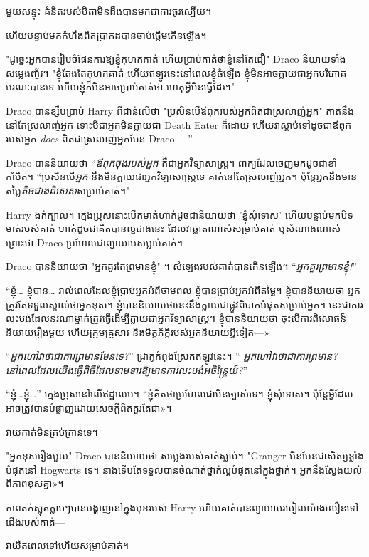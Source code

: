 {{{{{{មួយសន្ទុះ គំនិតរបស់បិតាមិនដឹងបានមកជាការធូរស្បើយ។

ហើយបន្ទាប់មកកំហឹងពិតប្រាកដបានចាប់ផ្តើមកើនឡើង។

"ដូច្នេះអ្នកបានរៀបចំផែនការឱ្យខ្ញុំកុហកគាត់ ហើយប្រាប់គាត់ថាខ្ញុំនៅតែជឿ" Draco និយាយទាំងសម្លេងញ័រ។ "ខ្ញុំតែងតែកុហកគាត់ ហើយឥឡូវនេះនៅពេលខ្ញុំធំឡើង ខ្ញុំមិនអាចក្លាយជាអ្នកបរិភោគមរណៈបានទេ ហើយខ្ញុំក៏មិនអាចប្រាប់គាត់ថា ហេតុអ្វីមិនធ្វើដែរ។"

Draco បានខ្សឹបប្រាប់ Harry ពីជាន់លើថា "ប្រសិនបើឪពុករបស់អ្នកពិតជាស្រលាញ់អ្នក" គាត់នឹងនៅតែស្រលាញ់អ្នក ទោះបីជាអ្នកមិនក្លាយជា Death Eater ក៏ដោយ ហើយវាស្តាប់ទៅដូចជាឪពុករបស់អ្នក \emph{does} ពិតជាស្រលាញ់អ្នកមែន Draco —”

Draco បាននិយាយថា “\emph{ឪពុកចុងរបស់អ្នក} គឺជាអ្នកវិទ្យាសាស្ត្រ។ ពាក្យដែលចេញមកដូចជាខាំកាំបិត។ “ប្រសិនបើ\emph{អ្នក} នឹងមិនក្លាយជាអ្នកវិទ្យាសាស្ត្រទេ គាត់នៅតែស្រលាញ់អ្នក។ ប៉ុន្តែអ្នកនឹងមានតម្លៃ\emph{តិចជាងពិសេស}សម្រាប់គាត់។"

Harry ងក់ក្បាល។ ក្មេងប្រុសនោះបើកមាត់ហាក់ដូចជានិយាយថា 'ខ្ញុំសុំទោស' ហើយបន្ទាប់មកបិទមាត់របស់គាត់ ហាក់ដូចជាគិតបានល្អជាងនេះ ដែលវាឆ្លាតណាស់សម្រាប់គាត់ ឬសំណាងណាស់ ព្រោះថា Draco ប្រហែលជាព្យាយាមសម្លាប់គាត់។

Draco បាននិយាយថា "អ្នកគួរតែព្រមានខ្ញុំ" ។ សំឡេងរបស់គាត់បានកើនឡើង។ “\emph{អ្នកគួរព្រមានខ្ញុំ!}”

“ខ្ញុំ… ខ្ញុំបាន… រាល់ពេលដែលខ្ញុំប្រាប់អ្នកអំពីថាមពល ខ្ញុំបានប្រាប់អ្នកអំពីតម្លៃ។ ខ្ញុំបាននិយាយថា អ្នកត្រូវតែទទួលស្គាល់ថាអ្នកខុស។ ខ្ញុំបាននិយាយថានេះនឹងក្លាយជាផ្លូវពិបាកបំផុតសម្រាប់អ្នក។ នេះ​ជា​ការ​លះបង់​ដែល​នរណា​ម្នាក់​ត្រូវ​ធ្វើ​ដើម្បី​ក្លាយ​ជា​អ្នក​វិទ្យាសាស្ត្រ។ ខ្ញុំ​បាន​និយាយ​ថា ចុះ​បើ​ការ​ពិសោធន៍​និយាយ​រឿង​មួយ ហើយ​ក្រុម​គ្រួសារ និង​មិត្តភ័ក្តិ​របស់​អ្នក​និយាយ​អ្វី​ទៀត—»

“\emph{អ្នកហៅវាថាជាការព្រមានមែនទេ?}” ដ្រាកូកំពុងស្រែកឥឡូវនេះ។ “\emph{ អ្នកហៅវាថាជាការព្រមាន? នៅពេលដែលយើងធ្វើពិធីដែលទាមទារឱ្យមានការលះបង់អចិន្ត្រៃយ៍?}”

“ខ្ញុំ…ខ្ញុំ…” ក្មេងប្រុសនៅលើឥដ្ឋលេប។ “ខ្ញុំ​គិត​ថា​ប្រហែល​ជា​មិន​ច្បាស់​ទេ។ ខ្ញុំសុំទោស។ ប៉ុន្តែ​អ្វី​ដែល​អាច​ត្រូវ​បាន​បំផ្លាញ​ដោយ​សេចក្ដី​ពិត​គួរ​តែ​ជា»។

វាយគាត់មិនគ្រប់គ្រាន់ទេ។

"អ្នកខុសរឿងមួយ" Draco បាននិយាយថា សម្លេងរបស់គាត់ស្លាប់។ "Granger មិនមែនជាសិស្សខ្លាំងបំផុតនៅ Hogwarts ទេ។ នាងទើបតែទទួលបានចំណាត់ថ្នាក់ល្អបំផុតនៅក្នុងថ្នាក់។ អ្នក​នឹង​ស្វែង​យល់​ពី​ភាព​ខុស​គ្នា»។

ភាពតក់ស្លុតភ្លាមៗបានបង្ហាញនៅក្នុងមុខរបស់ Harry ហើយគាត់បានព្យាយាមរមៀលយ៉ាងលឿនទៅជើងរបស់គាត់—

វាយឺតពេលទៅហើយសម្រាប់គាត់។

}}}}}}
